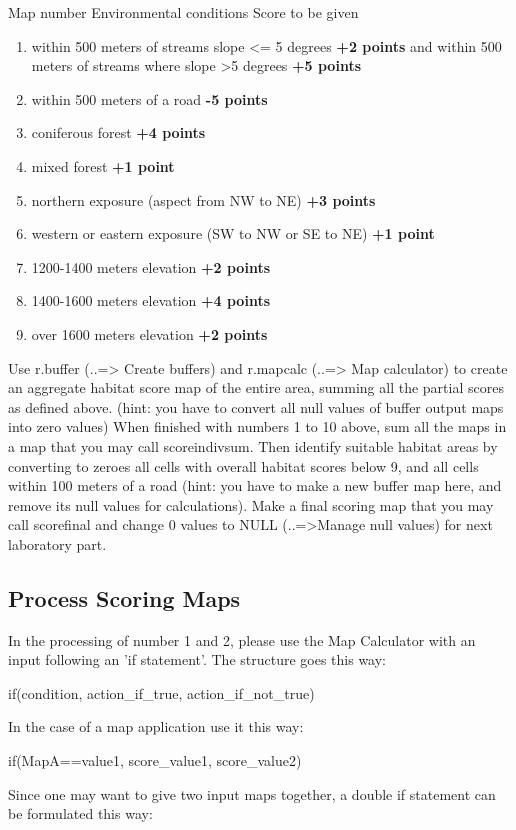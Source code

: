 Map number Environmental conditions Score to be given
\begin{enumerate}
 \item within 500 meters of streams slope <= 5 degrees \textbf{+2 points} and within 500 meters of streams where slope >5 degrees \textbf{+5 points}
 \item within 500 meters of a road \textbf{-5 points}
 \item coniferous forest \textbf{+4 points}
 \item mixed forest \textbf{+1 point}
 \item northern exposure (aspect from NW to NE) \textbf{+3 points}
 \item western or eastern exposure (SW to NW or SE to NE) \textbf{+1 point}
 \item 1200-1400 meters elevation \textbf{+2 points}
 \item 1400-1600 meters elevation \textbf{+4 points}
 \item over 1600 meters elevation \textbf{+2 points}
\end{enumerate}

Use r.buffer (..=> Create buffers) and r.mapcalc (..=> Map calculator) to create an aggregate habitat score map of the entire area, summing all the partial scores as defined above. (hint: you have to convert all null values of buffer output maps into zero values)
When finished with numbers 1 to 10 above, sum all the maps in a map that you may call scoreindivsum. Then identify suitable habitat areas by converting to zeroes all cells with overall habitat scores below 9, and all cells within 100 meters of a road (hint: you have to make a new buffer map here, and remove its null values for calculations). Make a final scoring map that you may call scorefinal and change 0 values to NULL (..=>Manage null values) for next laboratory part.

\subsection{Process Scoring Maps}

In the processing of number 1 and 2, please use the Map Calculator with an input following an 'if statement'. The structure goes this
way:
\begin{smallverbatim}
if(condition, action_if_true, action_if_not_true)
\end{smallverbatim}
In the case of a map application use it this way:
\begin{smallverbatim}
if(MapA==value1, score_value1, score_value2)
\end{smallverbatim}
Since one may want to give two input maps together, a double if statement can be formulated this way:

